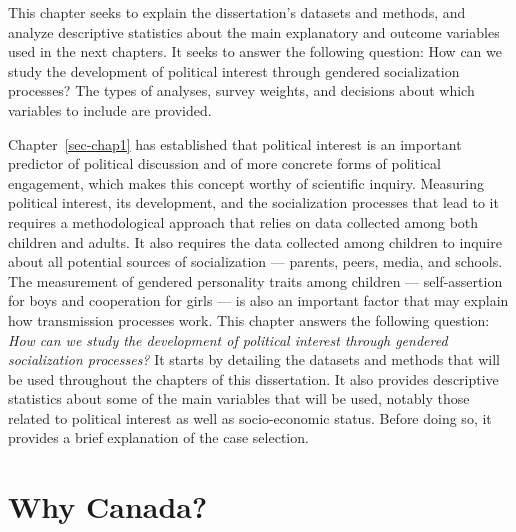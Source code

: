 \documentclass[
  letterpaper,
  DIV=11,
  numbers=noendperiod]{scrreprt}
\begin{document}
This chapter seeks to explain the dissertation's datasets and methods,
and analyze descriptive statistics about the main explanatory and
outcome variables used in the next chapters. It seeks to answer the
following question: How can we study the development of political
interest through gendered socialization processes? The types of
analyses, survey weights, and decisions about which variables to include
are provided.

\hfill\break

Chapter~\ref{sec-chap1} has established that political interest is an
important predictor of political discussion and of more concrete forms
of political engagement, which makes this concept worthy of scientific
inquiry. Measuring political interest, its development, and the
socialization processes that lead to it requires a methodological
approach that relies on data collected among both children and adults.
It also requires the data collected among children to inquire about all
potential sources of socialization --- parents, peers, media, and
schools. The measurement of gendered personality traits among children
--- self-assertion for boys and cooperation for girls --- is also an
important factor that may explain how transmission processes work. This
chapter answers the following question: \emph{How can we study the
development of political interest through gendered socialization
processes?} It starts by detailing the datasets and methods that will be
used throughout the chapters of this dissertation. It also provides
descriptive statistics about some of the main variables that will be
used, notably those related to political interest as well as
socio-economic status. Before doing so, it provides a brief explanation
of the case selection.

\section{Why Canada?}\label{why-canada}
\end{document}
